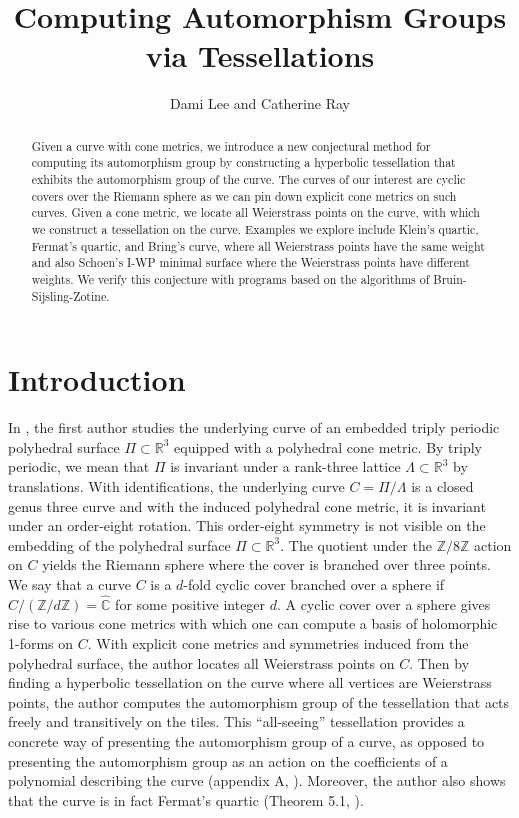 \documentclass[12pt,reqno]{amsart}
\title{Computing Automorphism Groups via Tessellations}
\author{Dami Lee and Catherine Ray}
\newcommand{\C}{\mathbb{C}}
\newcommand{\Z}{\mathbb{Z}}
\newcommand{\R}{\mathbb{R}}
\theoremstyle{definition}
\theoremstyle{remark}
\begin{document}
	
\maketitle

\begin{abstract}
Given a curve with cone metrics, we introduce a new conjectural method for computing its automorphism group by constructing a hyperbolic tessellation that exhibits the automorphism group of the curve. The curves of our interest are cyclic covers over the Riemann sphere as we can pin down explicit cone metrics on such curves. Given a cone metric, we locate all Weierstrass points on the curve, with which we construct a tessellation on the curve. Examples we explore include Klein's quartic, Fermat's quartic, and Bring's curve, where all Weierstrass points have the same weight and also Schoen's I-WP minimal surface where the Weierstrass points have different weights. We verify this conjecture with programs based on the algorithms of Bruin-Sijsling-Zotine.
\end{abstract}



\section{Introduction}


In \cite{dami}, the first author studies the underlying curve of an embedded triply periodic polyhedral surface $\Pi \subset \R^3$ equipped with a polyhedral cone metric. By triply periodic, we mean that $\Pi$ is invariant under a rank-three lattice $\Lambda \subset \R^3$ by translations. With identifications, the underlying curve $C = \Pi / \Lambda$ is a closed genus three curve and with the induced polyhedral cone metric, it is invariant under an order-eight rotation. This order-eight symmetry is not visible on the embedding of the polyhedral surface $\Pi \subset \R^3.$ The quotient under the $\Z/ 8 \Z$ action on $C$ yields the Riemann sphere where the cover is branched over three points. We say that a curve $C$ is a $d$-fold cyclic cover branched over a sphere if $C / (\Z / d \Z) = \widehat{\C}$ for some positive integer $d.$ A cyclic cover over a sphere gives rise to various cone metrics with which one can compute a basis of holomorphic 1-forms on $C.$ With explicit cone metrics and symmetries induced from the polyhedral surface, the author locates all Weierstrass points on $C.$ Then by finding a hyperbolic tessellation on the curve where all vertices are Weierstrass points, the author computes the automorphism group of the tessellation that acts freely and transitively on the tiles. This ``all-seeing'' tessellation provides a concrete way of presenting the automorphism group of a curve, as opposed to presenting the automorphism group as an action on the coefficients of a polynomial describing the curve (appendix A, \cite{silverman}). Moreover, the author also shows that the curve is in fact Fermat's quartic (Theorem 5.1, \cite{dami}).
\end{document}
